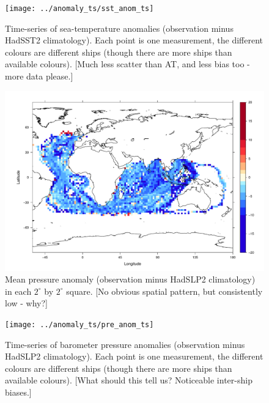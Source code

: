 \documentclass[a4paper,11pt]{article}
\begin{document}
\begin{figure}
\begin{center}
\texttt{[image: ../anomaly\_ts/sst\_anom\_ts]}
\caption{Time-series of sea-temperature anomalies (observation minus HadSST2 climatology). Each point is one measurement, the different colours are different ships (though there are more ships than available colours). [Much less scatter than AT, and less bias too - more data please.] }
\label{sst_anom_ts}
\end{center}
\end{figure}

\clearpage

\begin{figure}
\begin{center}
\includegraphics[angle=0, width=1.0\textwidth]{../anomaly_map/pre_anomaly}
\caption{Mean pressure anomaly (observation minus HadSLP2 climatology) in each $2^\circ$ by $2^\circ$ square. [No obvious spatial pattern, but consistently low - why?]}
\label{pressure_anomaly}
\end{center}
\end{figure}

\begin{figure}
\begin{center}
\texttt{[image: ../anomaly\_ts/pre\_anom\_ts]}
\caption{Time-series of barometer pressure anomalies (observation minus HadSLP2 climatology). Each point is one measurement, the different colours are different ships (though there are more ships than available colours). [What should this tell us? Noticeable inter-ship biases.] }
\label{pre_anom_ts}
\end{center}
\end{figure}
\end{document}
